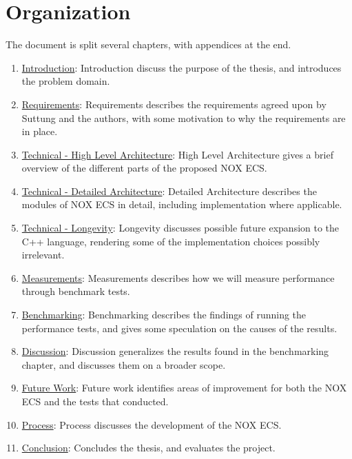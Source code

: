 \section{Organization}
The document is split several chapters, with appendices at the end.
\begin{enumerate}
    \item
    \hyperref[chap:introduction]{Introduction}: Introduction discuss the purpose of the thesis, and introduces the problem domain.
    \item
    \hyperref[chap:requirements]{Requirements}: Requirements describes the requirements agreed upon by Suttung and the authors,
    with some motivation to why the requirements are in place.
    \item
    \hyperref[chap:technical_high_level_architecture]{Technical - High Level Architecture}: High Level Architecture gives a brief overview of the different parts of the proposed NOX ECS.
    \item
    \hyperref[chap:technical_detailed_architecture]{Technical - Detailed Architecture}: Detailed Architecture describes the modules of NOX ECS in detail, including implementation where applicable.
    \item
    \hyperref[chap:technical_longevity]{Technical - Longevity}: Longevity discusses possible future expansion to the C++ language, rendering some of the implementation choices possibly irrelevant.
    \item
    \hyperref[chap:measurements]{Measurements}: Measurements describes how we will measure performance through benchmark tests.
    \item
    \hyperref[chap:benchmarking]{Benchmarking}: Benchmarking describes the findings of running the performance tests, and gives some speculation on the causes of the results.
    \item
    \hyperref[chap:discussion]{Discussion}: Discussion generalizes the results found in the benchmarking chapter, and discusses them on a broader scope.
    \item
    \hyperref[chap:future_work]{Future Work}: Future work identifies areas of improvement for both the NOX ECS and the tests that conducted.
    \item
    \hyperref[chap:process]{Process}: Process discusses the development of the NOX ECS.
    \item
    \hyperref[chap:conclusion]{Conclusion}: Concludes the thesis, and evaluates the project.
\end{enumerate}
